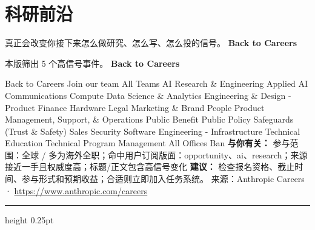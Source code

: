 \documentclass[10.5pt]{ctexart}
\begin{document}
\section*{科研前沿}
{\color{ormuted} 真正会改变你接下来怎么做研究、怎么写、怎么投的信号。}
\vspace{2mm}
{\LARGE\bfseries Back to Careers}\par
\vspace{1mm}
{\color{ormuted} 本版筛出 5 个高信号事件。}
\vspace{3mm}
{\Large\bfseries Back to Careers}\par
Back to Careers Join our team All Teams AI Research \& Engineering Applied AI Communications Compute Data Science \& Analytics Engineering \& Design - Product Finance Hardware Legal Marketing \& Brand People Product Management, Support, \& Operations Public Benefit Public Policy Safeguards (Trust \& Safety) Sales Security Software Engineering - Infrastructure Technical Education Technical Program Management All Offices Ban
\textbf{与你有关：} 参与范围：全球 / 多为海外全职；命中用户订阅版面：opportunity、ai、research；来源接近一手且权威度高；标题/正文包含高信号变化
\textbf{建议：} 检查报名资格、截止时间、参与形式和预期收益；合适则立即加入任务系统。
{\footnotesize\color{ormuted} 来源：Anthropic Careers · \url{https://www.anthropic.com/careers}}
\vspace{4mm}
\hrule height 0.25pt
\vspace{3mm}
\end{document}
